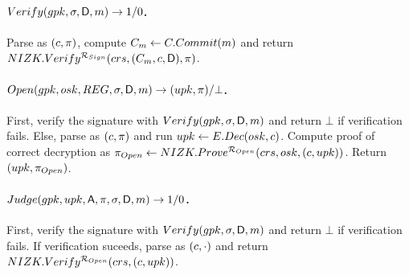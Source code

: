 \paragraph{$Verify(gpk,\sigma,\mathsf{D},m) \rightarrow 1/0$.} %
Parse \sig as $(c,\pi)$, compute $C_{m} \gets C.Commit(m)$ and
return $NIZK.Verify^{\mathcal{R}_{Sign}}(crs,(C_{m},c,\mathsf{D}),
\pi)$.

\paragraph{$\Open(\gpk,\osk,\trans,\sig,\DAttrs,\msg)
  \rightarrow (\upk,\oproof)/\bot$.} %
First, verify the signature with $Verify(gpk,\sigma,\mathsf{D},m)$ and
return $\bot$ if verification fails. Else, parse \sig as $(c,\pi)$
and run $upk \gets E.Dec(osk,c)$. Compute proof of correct decryption
as $\pi_{Open} \gets NIZK.Prove^{\mathcal{R}_{Open}}(crs,osk,(c,
upk))$. Return $(upk,\pi_{Open})$.

\paragraph{$Judge(gpk,upk,\mathsf{A},\pi,\sigma,\mathsf{D},m)
  \rightarrow 1/0$.} %
First, verify the signature with $Verify(gpk,\sigma,\mathsf{D},m)$ and
return $\bot$ if verification fails. If verification suceeds, parse
\sig as $(c,\cdot)$ and return $NIZK.Verify^{\mathcal{R}_{Open}}(crs,(c,
upk))$.


